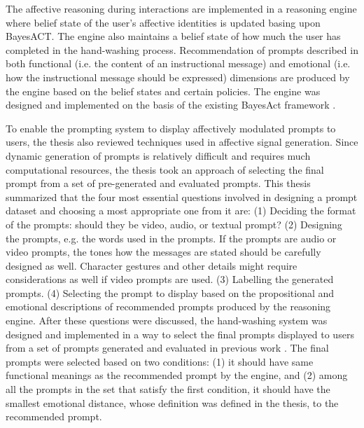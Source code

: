 The affective reasoning during interactions are implemented in a reasoning engine where belief state of the user's affective identities is updated basing upon BayesACT. The engine also maintains a belief state of how much the user has completed in the hand-washing process. Recommendation of prompts described in both functional (i.e. the content of an instructional message) and emotional (i.e. how the instructional message should be expressed) dimensions are produced by the engine based on the belief states and certain policies. The engine was designed and implemented on the basis of the existing BayesAct framework \cite{hoey2013bayesian}.

To enable the prompting system to display affectively modulated prompts to users, the thesis also reviewed techniques used in affective signal generation. Since dynamic generation of prompts is relatively difficult and requires much computational resources, the thesis took an approach of selecting the final prompt from a set of pre-generated and evaluated prompts. This thesis summarized that the four most essential questions involved in designing a prompt dataset and choosing a most appropriate one from it are: (1) Deciding the format of the prompts: should they be video, audio, or textual prompt? (2) Designing the prompts, e.g. the words used in the prompts. If the prompts are audio or video prompts, the tones how the messages are stated should be carefully designed as well. Character gestures and other details might require considerations as well if video prompts are used. (3) Labelling the generated prompts. (4) Selecting the prompt to display based on the propositional and emotional descriptions of recommended prompts produced by the reasoning engine. After these questions were discussed, the hand-washing system was designed and implemented in a way to select the final prompts displayed to users from a set of prompts generated and evaluated in previous work \cite{malhotra2014}. The final prompts were selected based on two conditions: (1) it should have same functional meanings as the recommended prompt by the engine, and (2) among all the prompts in the set that satisfy the first condition, it should have the smallest emotional distance, whose definition was defined in the thesis, to the recommended prompt.


